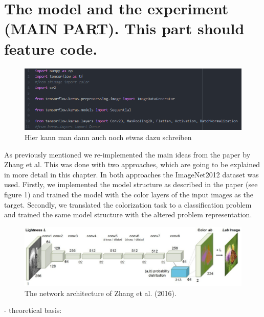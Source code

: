 \documentclass[12pt,letterpaper]{article}
\begin{document}
\section{The model and the experiment (MAIN PART). This part should feature code.}
\begin{figure}[ht]
	\centering
	\includegraphics[width=1.0\textwidth]{bsp.png}
	\caption{Hier kann man dann auch noch etwas dazu schreiben}
	\label{bsp}
\end{figure}
As previously mentioned we re-implemented the main ideas from the paper by Zhang et al. This was done with two approaches, which are going to be explained in more detail in this chapter. In both approaches the ImageNet2012 dataset was used. Firstly, we implemented the model structure as described in the paper (see figure 1) and trained the model with the color layers of the input images as the target. Secondly, we translated the colorization task to a classification problem and trained the same model structure with the altered problem representation.
\begin{figure}[ht]
	\centering
	\includegraphics[width=1.0\textwidth]{layer.png}
	\caption{The network architecture of Zhang et al. (2016). }
	\label{fig1}
\end{figure}
- theoretical basis:\\
\end{document}
